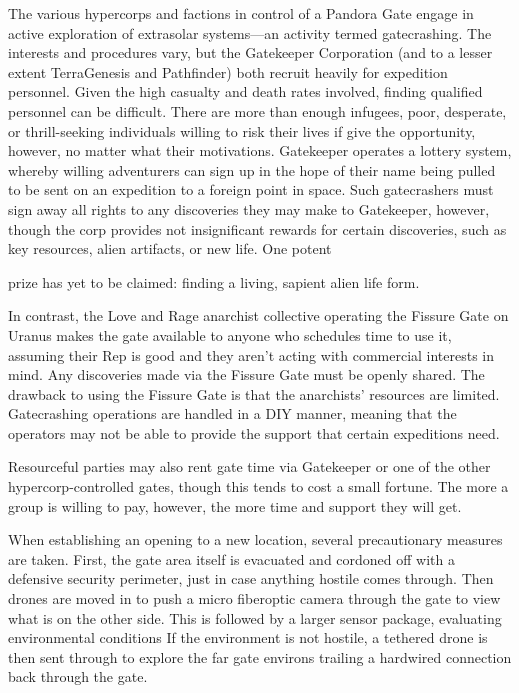 The various hypercorps and factions in control of a Pandora Gate engage in active exploration of extrasolar systems—an activity termed gatecrashing. The interests and procedures vary, but the Gatekeeper Corporation (and to a lesser extent TerraGenesis and Pathfinder) both recruit heavily for expedition personnel. Given the high casualty and death rates involved, finding qualified personnel can be difficult. There are more than enough infugees, poor, desperate, or thrill-seeking individuals willing to risk their lives if give the opportunity, however, no matter what their motivations. Gatekeeper operates a lottery system, whereby willing adventurers can sign up in the hope of their name being pulled to be sent on an expedition to a foreign point in space. Such gatecrashers must sign away all rights to any discoveries they may make to Gatekeeper, however, though the corp provides not insignificant rewards for certain discoveries, such as key resources, alien artifacts, or new life. One potent 

prize has yet to be claimed: finding a living, sapient alien life form. 

In contrast, the Love and Rage anarchist collective operating the Fissure Gate on Uranus makes the gate available to anyone who schedules time to use it, assuming their Rep is good and they aren't acting with commercial interests in mind. Any discoveries made via the Fissure Gate must be openly shared. The drawback to using the Fissure Gate is that the anarchists' resources are limited. Gatecrashing operations are handled in a DIY manner, meaning that the operators may not be able to provide the support that certain expeditions need. 

Resourceful parties may also rent gate time via Gatekeeper or one of the other hypercorp-controlled gates, though this tends to cost a small fortune. The more a group is willing to pay, however, the more time and support they will get. 

When establishing an opening to a new location, several precautionary measures are taken. First, the gate area itself is evacuated and cordoned off with a defensive security perimeter, just in case anything hostile comes through. Then drones are moved in to push a micro fiberoptic camera through the gate to view what is on the other side. This is followed by a larger sensor package, evaluating environmental conditions If the environment is not hostile, a tethered drone is then sent through to explore the far gate environs trailing a hardwired connection back through the gate. 

